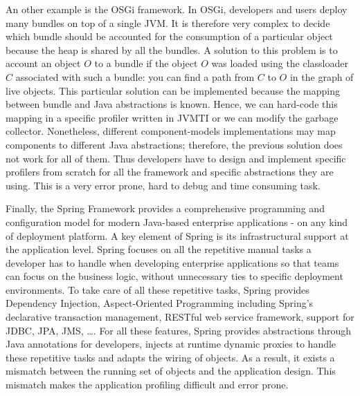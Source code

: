 An other example is the OSGi framework. 
In OSGi, developers and users deploy many bundles on top of a single JVM.
It is therefore very complex to decide which bundle should be accounted for the consumption of a particular object because the heap is shared by all the bundles.
A solution to this problem is to account an object $O$ to a bundle if the object $O$ was loaded using the classloader $C$ associated with such a bundle: you can find a path from $C$ to $O$ in the graph of live objects.
This particular solution can be implemented because the mapping between bundle and Java abstractions is known. 
Hence, we can hard-code this mapping in a specific profiler written in JVMTI or we can modify the garbage collector.
Nonetheless, different component-models implementations may map components to different Java abstractions; therefore, the previous solution does not work for all of them.
Thus developers have to design and implement specific profilers from scratch for all the framework and specific abstractions they are using. 
This is a very error prone, hard to debug and time consuming task. 

Finally, the Spring Framework provides a comprehensive programming and configuration model for modern Java-based enterprise applications - on any kind of deployment platform. 
A key element of Spring is its infrastructural support at the application level.
Spring focuses on all the repetitive manual tasks a developer has to handle when developing enterprise applications so that teams can focus on the business logic, without unnecessary ties to specific deployment environments. 
To take care of all these repetitive tasks, Spring provides Dependency Injection, Aspect-Oriented Programming including Spring's declarative transaction management, RESTful web service framework, support for JDBC, JPA, JMS, \dots. 
For all these features, Spring provides abstractions through Java annotations for developers, injects at runtime dynamic proxies to handle these repetitive tasks and adapts the wiring of objects. 
As a result, it exists a mismatch between the running set of objects and the application design. 
This mismatch makes the application profiling difficult and error prone. 
